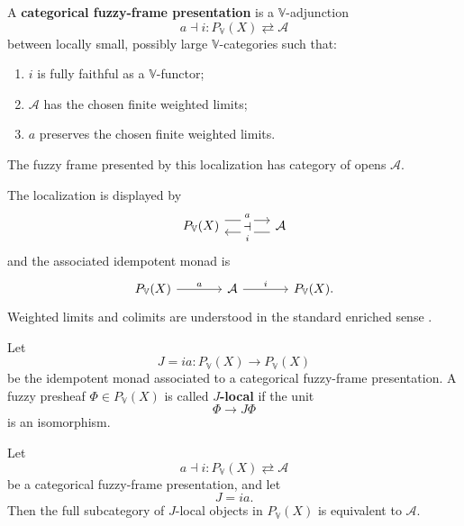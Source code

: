 \begin{definition}
\label{def:fuzzy-frame-presentation-categorical}
A \textbf{categorical fuzzy-frame presentation} is a \(\mathbb V\)-adjunction
\[
    a\dashv i:
    P_{\mathbb V}(X)\rightleftarrows \mathcal A
\]
between locally small, possibly large \(\mathbb V\)-categories such that:
\begin{enumerate}
    \item \(i\) is fully faithful as a \(\mathbb V\)-functor;
    \item \(\mathcal A\) has the chosen finite weighted limits;
    \item \(a\) preserves the chosen finite weighted limits.
\end{enumerate}
The fuzzy frame presented by this localization has category of opens \(\mathcal A\).
\end{definition}

The localization is displayed by
\[
\begin{tikzcd}[column sep=large, row sep=large]
P_{\mathbb V}(X)
    \arrow[r, shift left=1.1ex, "a"]
&
\mathcal A
    \arrow[l, shift left=1.1ex, "i"]
\arrow[phantom, from=1-1, to=1-2, "\dashv" description]
\end{tikzcd}
\]
and the associated idempotent monad is
\[
\begin{tikzcd}[column sep=large]
P_{\mathbb V}(X)
    \arrow[r, "a"]
&
\mathcal A
    \arrow[r, "i"]
&
P_{\mathbb V}(X).
\end{tikzcd}
\]
Weighted limits and colimits are understood in the standard enriched sense
\cite{Kelly1982BasicConcepts}.

\begin{definition}
\label{def:local-object-categorical}
Let
\[
    J=ia:P_{\mathbb V}(X)\to P_{\mathbb V}(X)
\]
be the idempotent monad associated to a categorical fuzzy-frame presentation. A fuzzy
presheaf \(\Phi\in P_{\mathbb V}(X)\) is called \textbf{\(J\)-local} if the unit
\[
    \Phi\to J\Phi
\]
is an isomorphism.
\end{definition}

\begin{proposition}
\label{prop:local-objects-categorical}
Let
\[
    a\dashv i:
    P_{\mathbb V}(X)\rightleftarrows \mathcal A
\]
be a categorical fuzzy-frame presentation, and let
\[
    J=ia.
\]
Then the full subcategory of \(J\)-local objects in \(P_{\mathbb V}(X)\) is equivalent
to \(\mathcal A\).
\end{proposition}

